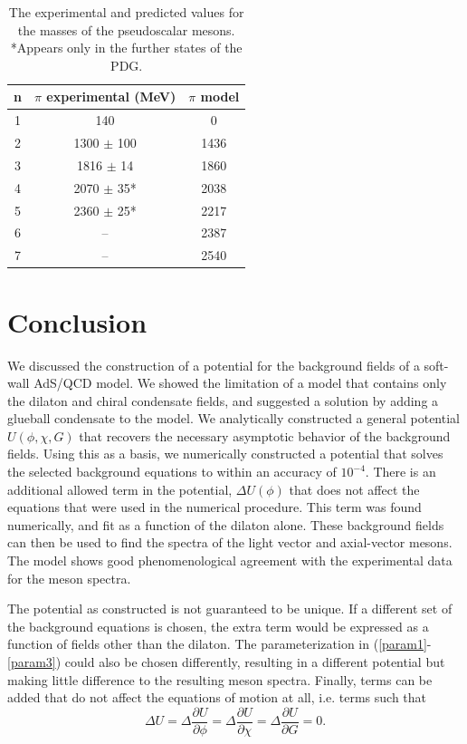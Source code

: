 \documentclass[aps,prd,12pt,nofootinbib]{revtex4}
\newcommand{\be}{\begin{equation}}
\newcommand{\ee}{\end{equation}}
\begin{document}
\begin{table}[htb]
\label{tabPion}
\begin{center}
\begin{tabular}{| c || c | c  |}
\hline
n & $\pi$ experimental (MeV) & $\pi$ model \\
\hline
1 & 140 &				0 \\
2 & 1300 $\pm$ 100 & 	1436 \\
3 & 1816 $\pm$ 14&		1860 \\
4 & 2070 $\pm$ 35* & 	2038 \\ 
5 & 2360 $\pm$ 25* &	2217	\\
6 & -- & 				2387 \\
7 & -- & 				2540 \\
\hline
\end{tabular}
\caption{The experimental and predicted values for the masses of the pseudoscalar mesons.
*Appears only in the further states of the PDG.}
\end{center}

\end{table}


\section{Conclusion}

We discussed the construction of a potential for the background fields of a soft-wall AdS/QCD model. 
We showed the limitation of a model that contains only the dilaton and chiral condensate fields, and suggested a solution by adding a glueball condensate to the model.
We analytically constructed a general potential $U(\phi,\chi,G)$ that recovers the necessary asymptotic behavior of the background fields.
Using this as a basis, we numerically constructed a potential that solves the selected background equations to within an accuracy of $10^{-4}$. 
There is an additional allowed term in the  potential, $\Delta U(\phi)$ that does not affect the equations that were used in the numerical procedure. 
This term was found numerically, and fit as a function of the dilaton alone.
These background fields can then be used to find the spectra of the light vector and axial-vector mesons.
The model shows good phenomenological agreement with the experimental data for the meson spectra.

The potential as constructed is not guaranteed to be unique.
If a different set of the background equations is chosen, the extra term would be expressed as a function of fields other than the dilaton.
The parameterization in (\ref{param1}-\ref{param3}) could also be chosen differently, resulting in a different potential but making little difference to the resulting meson spectra.
Finally, terms can be added that do not affect the equations of motion at all, i.e. terms such that 
\be
\Delta U = \Delta \frac{\partial U}{\partial \phi} = \Delta \frac{\partial U}{\partial \chi} = \Delta \frac{\partial U}{\partial G} =0.
\ee
\end{document}
